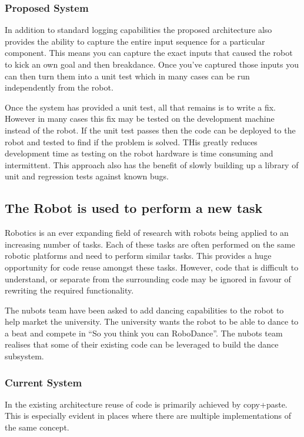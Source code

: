 \documentclass[english,12pt]{scrartcl}
\begin{document}
			\subsubsection{Proposed System}
				In addition to standard logging capabilities the proposed architecture also provides the ability to capture the entire input sequence for a particular component.
				This means you can capture the exact inputs that caused the robot to kick an own goal and then breakdance.
				Once you've captured those inputs you can then turn them into a unit test which in many cases can be run independently from the robot.
				
				Once the system has provided a unit test, all that remains is to write a fix.
				However in many cases this fix may be tested on the development machine instead of the robot.
				If the unit test passes then the code can be deployed to the robot and tested to find if the problem is solved. THis greatly reduces development time as testing on the robot hardware is time consuming and intermittent.
				This approach also has the benefit of slowly building up a library of unit and regression tests against known bugs.

		\subsection{The Robot is used to perform a new task}
			Robotics is an ever expanding field of research with robots being applied to an
			increasing number of tasks. Each of these tasks are often performed on the same robotic
			platforms and need to perform similar tasks. This provides a huge opportunity for code
			reuse amongst these tasks. However, code that is difficult to understand, or separate
			from the surrounding code may be ignored in favour of rewriting the required
			functionality.

			The \gls{nubots} team have been asked to add dancing capabilities to the robot to help market the 
			university. The university wants the robot to be able to dance to a beat and compete in 
			``So you think you can RoboDance''. The \gls{nubots} team realises that some of their existing
			code can be leveraged to build the dance subsystem.

			\subsubsection{Current System}
				In the existing architecture reuse of code is primarily achieved by copy+paste. This is 
				especially evident in places where there are multiple implementations of the same concept.
				
\end{document}
